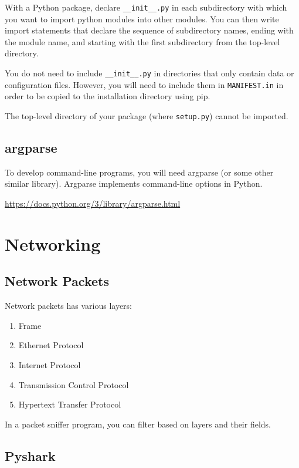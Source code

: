 \documentclass{article}
\begin{document}
With a Python package, declare \texttt{\_\_init\_\_.py} in each subdirectory with which 
you want to import python modules into other modules. You can then write import 
statements that declare the sequence of subdirectory names, 
ending with the module name, and starting with the first subdirectory from 
the top-level directory.

You do not need to include \texttt{\_\_init\_\_.py} in directories that only
contain data or configuration files.
However, you will need to include them in \texttt{MANIFEST.in} in order
to be copied to the installation directory using pip.

The top-level directory of your package (where \texttt{setup.py}) cannot be imported.


\subsection{argparse}

To develop command-line programs, you will need argparse
(or some other similar library). Argparse implements
command-line options in Python.

\url{https://docs.python.org/3/library/argparse.html}

\newpage

\section{Networking}

\subsection{Network Packets}


Network packets has various layers:
\begin{enumerate}
\item Frame
\item Ethernet Protocol
\item Internet Protocol
\item Transmission Control Protocol
\item Hypertext Transfer Protocol
\end{enumerate}
In a packet sniffer program, you can filter based on layers and their fields.


\subsection{Pyshark}
\end{document}
